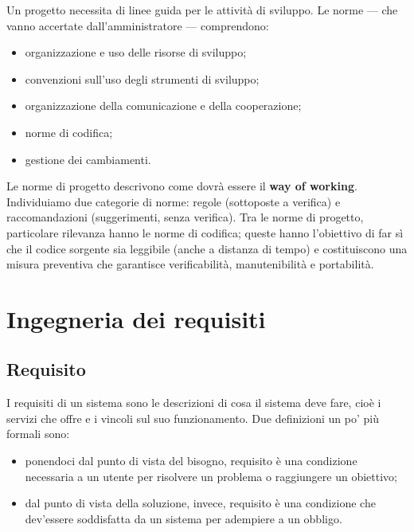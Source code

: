 \documentclass[a4paper]{article}
\begin{document}
		
Un progetto necessita di linee guida per le attività di sviluppo. Le norme — che vanno accertate dall'amministratore — comprendono:
		
	\begin{itemize}
		
			
	\item organizzazione e uso delle risorse di sviluppo;
			
	\item convenzioni sull'uso degli strumenti di sviluppo;
			
	\item organizzazione della comunicazione e della cooperazione;
			
	\item norme di codifica;
			
	\item gestione dei cambiamenti.
		
	\end{itemize}

		
Le norme di progetto descrivono come dovrà essere il \textbf{way of working}. Individuiamo due categorie di norme: regole (sottoposte a verifica) e raccomandazioni (suggerimenti, senza verifica). Tra le norme di progetto, particolare rilevanza hanno le norme di codifica; queste hanno l'obiettivo di far sì che il codice sorgente sia leggibile (anche a distanza di tempo) e costituiscono una misura preventiva che garantisce verificabilità, manutenibilità e portabilità.
	


		
	\section{Ingegneria dei requisiti}


		
	\subsection{Requisito}

		
I requisiti di un sistema sono le descrizioni di cosa il sistema deve fare, cioè i servizi che offre e i vincoli sul suo funzionamento. Due definizioni un po' più formali sono:
		
	\begin{itemize}
		
			
	\item ponendoci dal punto di vista del bisogno, requisito è una condizione necessaria a un utente per risolvere un problema o raggiungere un obiettivo;
			
	\item dal punto di vista della soluzione, invece, requisito è una condizione che dev'essere soddisfatta da un sistema per adempiere a un obbligo.
		
	\end{itemize}
\end{document}

